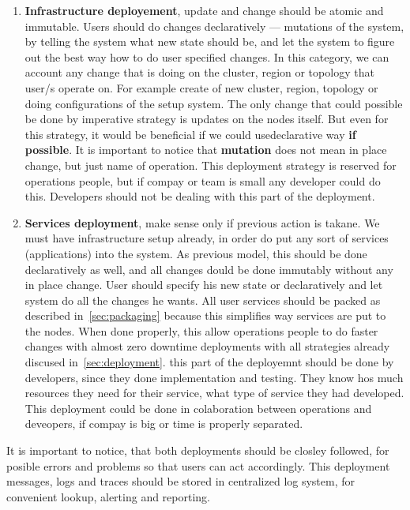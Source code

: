 \begin{enumerate}[start=1,label={(\bfseries \arabic*)}]
	\item \textbf{Infrastructure deployement}, update and change should be atomic and immutable. Users should do changes declaratively --- mutations of the system, by telling the system what new state should be, and let the system to figure out the best way how to do user specified changes. In this category, we can account any change that is doing on the cluster, region or topology that user/s operate on. For example create of new cluster, region, topology or doing configurations of the setup system. The only change that could possible be done by imperative strategy is updates on the nodes itself. But even for this strategy, it would be beneficial if we could usedeclarative way \textbf{if possible}. It is important to notice that \textbf{mutation} does not mean in place change, but just name of operation. This deployment strategy is reserved for operations people, but if compay or team is small any developer could do this. Developers should not be dealing with this part of the deployment.
	\item \textbf{Services deployment}, make sense only if previous action is takane. We must have infrastructure setup already, in order do put any sort of services (applications) into the system. As previous model, this should be done declaratively as well, and all changes dould be done immutably without any in place change. User should specify his new state or  declaratively and let system do all the changes he wants. All user services should be packed as described in~\ref{sec:packaging} because this simplifies way services are put to the nodes. When done properly, this allow operations people to do faster changes with almost zero downtime deployments with all strategies already discused in~\ref{sec:deployment}. this part of the deployemnt should be done by developers, since they done implementation and testing. They know hos much resources they need for their service, what type of service they had developed. This deployment could be done in colaboration between operations and deveopers, if compay is big or time is properly separated.
\end{enumerate}

It is important to notice, that both deployments should be closley followed, for posible errors and problems so that users can act accordingly. This deployment messages, logs and traces should be stored in centralized log system, for convenient lookup, alerting and reporting.

